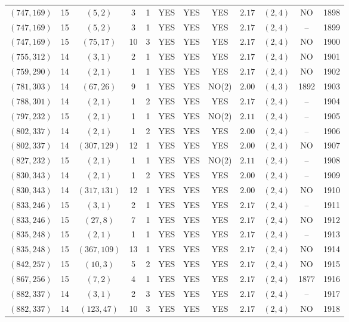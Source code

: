 \begin{longtable}{|c|c|c|c|c|c|c|c|c|c|c|c|}
$(747,169)$ & 15 & $(5,2)$ & 3 & 1 & YES & YES & YES & $2.17$ & $(2,4)$ & NO & 1898\\
$(747,169)$ & 15 & $(5,2)$ & 3 & 1 & YES & YES & YES & $2.17$ & $(2,4)$ & -- & 1899\\
$(747,169)$ & 15 & $(75,17)$ & 10 & 3 & YES & YES & YES & $2.17$ & $(2,4)$ & NO & 1900\\
$(755,312)$ & 14 & $(3,1)$ & 2 & 1 & YES & YES & YES & $2.17$ & $(2,4)$ & NO & 1901\\
$(759,290)$ & 14 & $(2,1)$ & 1 & 1 & YES & YES & YES & $2.17$ & $(2,4)$ & NO & 1902\\
$(781,303)$ & 14 & $(67,26)$ & 9 & 1 & YES & YES & NO(2) & $2.00$ & $(4,3)$ & 1892 & 1903\\
$(788,301)$ & 14 & $(2,1)$ & 1 & 2 & YES & YES & YES & $2.17$ & $(2,4)$ & -- & 1904\\
$(797,232)$ & 15 & $(2,1)$ & 1 & 1 & YES & YES & NO(2) & $2.11$ & $(2,4)$ & -- & 1905\\
$(802,337)$ & 14 & $(2,1)$ & 1 & 2 & YES & YES & YES & $2.00$ & $(2,4)$ & -- & 1906\\
$(802,337)$ & 14 & $(307,129)$ & 12 & 1 & YES & YES & YES & $2.00$ & $(2,4)$ & NO & 1907\\
$(827,232)$ & 15 & $(2,1)$ & 1 & 1 & YES & YES & NO(2) & $2.11$ & $(2,4)$ & -- & 1908\\
$(830,343)$ & 14 & $(2,1)$ & 1 & 2 & YES & YES & YES & $2.00$ & $(2,4)$ & -- & 1909\\
$(830,343)$ & 14 & $(317,131)$ & 12 & 1 & YES & YES & YES & $2.00$ & $(2,4)$ & NO & 1910\\
$(833,246)$ & 15 & $(3,1)$ & 2 & 1 & YES & YES & YES & $2.17$ & $(2,4)$ & -- & 1911\\
$(833,246)$ & 15 & $(27,8)$ & 7 & 1 & YES & YES & YES & $2.17$ & $(2,4)$ & NO & 1912\\
$(835,248)$ & 15 & $(2,1)$ & 1 & 1 & YES & YES & YES & $2.17$ & $(2,4)$ & -- & 1913\\
$(835,248)$ & 15 & $(367,109)$ & 13 & 1 & YES & YES & YES & $2.17$ & $(2,4)$ & NO & 1914\\
$(842,257)$ & 15 & $(10,3)$ & 5 & 2 & YES & YES & YES & $2.17$ & $(2,4)$ & NO & 1915\\
$(867,256)$ & 15 & $(7,2)$ & 4 & 1 & YES & YES & YES & $2.17$ & $(2,4)$ & 1877 & 1916\\
$(882,337)$ & 14 & $(3,1)$ & 2 & 3 & YES & YES & YES & $2.17$ & $(2,4)$ & -- & 1917\\
$(882,337)$ & 14 & $(123,47)$ & 10 & 3 & YES & YES & YES & $2.17$ & $(2,4)$ & NO & 1918\\

\end{longtable}
